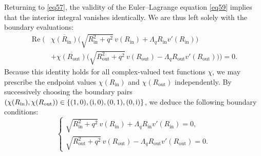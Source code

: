 \documentclass[12pt,reqno]{amsart}
\numberwithin{equation}{section}
\begin{document}
Returning to \eqref{eq57}, the validity of the Euler--Lagrange equation \eqref{eq59} implies that the interior integral vanishes identically. We are thus left solely with the boundary evaluations:
\begin{align*}
    \operatorname{Re} \Biggl( &\overline{\chi(R_{\mathrm{in}})} \bigl( \sqrt{R_{\mathrm{in}}^2 + q^2} \, v(R_{\mathrm{in}}) + \Lambda_q R_{\mathrm{in}} v'(R_{\mathrm{in}}) \bigr) \\
    &+ \overline{\chi(R_{\mathrm{out}})} \bigl( \sqrt{R_{\mathrm{out}}^2 + q^2} \, v(R_{\mathrm{out}}) - \Lambda_q R_{\mathrm{out}} v'(R_{\mathrm{out}}) \bigr) \Biggr) = 0.
\end{align*}
Because this identity holds for all complex-valued test functions $\chi$, we may prescribe the endpoint values $\chi(R_{\mathrm{in}})$ and $\chi(R_{\mathrm{out}})$ independently. By successively choosing the boundary pairs $(\chi(R_{\mathrm{in}}), \chi(R_{\mathrm{out}})) \in \{(1,0), ({\rm i},0), (0,1), (0,{\rm i})\}$, we deduce the following boundary conditions:
\begin{equation}\label{eq60}
\begin{cases}
    \sqrt{R_{\mathrm{in}}^2 + q^2} \, v(R_{\mathrm{in}}) + \Lambda_q R_{\mathrm{in}} v'(R_{\mathrm{in}}) = 0, \\[4pt]
    \sqrt{R_{\mathrm{out}}^2 + q^2} \, v(R_{\mathrm{out}}) - \Lambda_q R_{\mathrm{out}} v'(R_{\mathrm{out}}) = 0.
\end{cases}
\end{equation}
\end{document}
